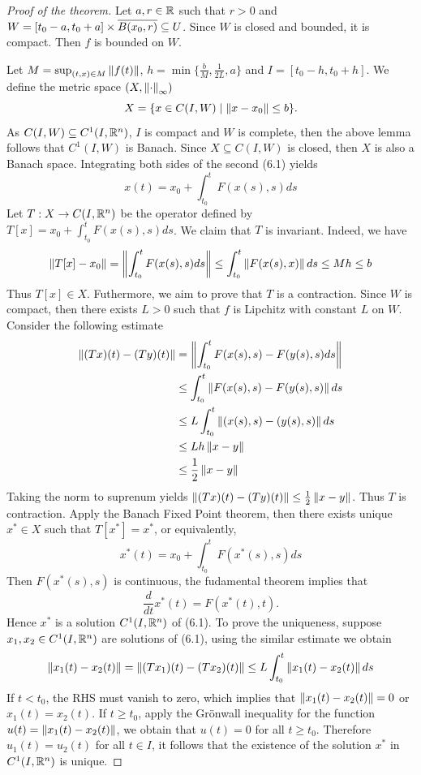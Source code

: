 \begin{proof}[Proof of the theorem]
    Let $a, r \in \mathbb{R}$ such that $r > 0$ and $W = [t_0 - a,t_0 +a] \times \overline{B(x_0,r)} \subseteq U$. Since $W$ is closed and bounded, it is compact. Then $f$ is bounded on $W$. 
    
    Let $M = \sup_{(t,x) \in M}\left\lVert f(t) \right\rVert$, $h = \min\{\frac{b}{M}, \frac{1}{2L},a\}$ and $I = [t_0 -h, t_0 + h]$. We define the metric space $(X, \left\lVert \cdot \right\rVert_{\infty})$
    \[
        X = \{x \in C(I,W) \mid \left\lVert x - x_0 \right\rVert \leq b\}.
    \] As $ C(I,W) \subseteq C^1(I, \mathbb{R}^n)$, $I$ is compact and $W$ is complete, then the above lemma follows that $C^1(I,W)$ is Banach. Since $X \subseteq C(I,W)$ is closed, then $X$ is also a Banach space. Integrating both sides of the second (6.1) yields
    \[
        x(t) = x_0 + \int_{t_0}^t F(x(s),s) ds
    \]
    Let $T: X \to C(I, \mathbb{R}^n)$ be the operator defined by $T[x] = x_0 + \int_{t_0}^t F(x(s),s) ds$. We claim that $T$ is invariant. Indeed, we have 
    \begin{align*}
        \left\lVert T[x] - x_0 \right\rVert = \left\lVert \int_{t_0}^t F(x(s),s) ds \right\rVert\leq \int_{t_0}^t\left\lVert F(x(s),x) \right\rVert ds \leq Mh \leq b
    \end{align*}
    Thus $T[x] \in X$. Futhermore, we aim to prove that $T$ is a contraction. Since $W$ is compact, then there exists $L > 0$ such that $f$ is Lipchitz with constant $L$ on $W$. Consider the following estimate 
    \begin{align*}
        \left\lVert (Tx)(t) - (Ty)(t) \right\rVert &= \left\lVert \int_{t_0}^t F(x(s),s) - F(y(s),s)ds \right\rVert\\
        &\leq \int_{t_0}^t\left\lVert F(x(s),s) - F(y(s),s) \right\rVert ds\\
        &\leq L\int_{t_0}^t\left\lVert (x(s),s) - (y(s),s) \right\rVert ds\\
        &\leq Lh\left\lVert x - y \right\rVert\\
        &\leq \frac{1}{2}\left\lVert x - y \right\rVert
    \end{align*}
    Taking the norm to suprenum yields $\left\lVert (Tx)(t) - (Ty)(t) \right\rVert \leq \frac{1}{2}\left\lVert x - y \right\rVert$. Thus $T$ is contraction. Apply the Banach Fixed Point theorem, then there exists unique $x^* \in X$ such that $T[x^*] = x^*$, or equivalently,
    \[
         x^*(t) = x_0 + \int_{t_0}^t F(x^*(s),s) ds
    \]
    Then $F(x^*(s),s)$ is continuous, the fudamental theorem implies that 
    \[
        \frac{d}{dt}x^*(t) = F(x^*(t),t).
    \]
    Hence $x^*$ is a solution $C^1(I,\mathbb{R}^n)$ of (6.1). To prove the uniqueness, suppose $x_1,x_2 \in C^1(I,\mathbb{R}^n)$ are solutions of (6.1), using the similar estimate we obtain
    \begin{align*}
        \left\lVert x_1(t) - x_2(t) \right\rVert = \left\lVert (Tx_1)(t) - (Tx_2)(t) \right\rVert \leq L \int_{t_0}^t\left\lVert x_1(t) - x_2(t) \right\rVert ds
    \end{align*}
    If $t < t_0$, the RHS must vanish to zero, which implies that $\left\lVert x_1(t) - x_2(t) \right\rVert = 0$ or $x_1(t) = x_2(t)$. If $t \geq t_0$, apply the Grönwall inequality for the function $u(t) = \left\lVert x_1(t) - x_2(t) \right\rVert$, we obtain that $u(t) = 0$ for all $t \geq t_0$. Therefore $u_1(t) = u_2(t)$ for all $t \in I$, it follows that the existence of the solution $x^*$ in $C^1(I,\mathbb{R}^n)$ is unique.
    
\end{proof}

